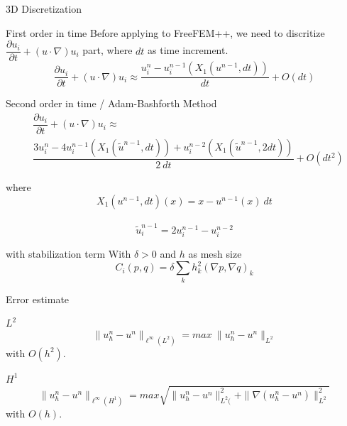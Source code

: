 \documentclass{beamer}
\begin{document}
\begin{frame}{3D Discretization}
\begin{block}{First order in time}
	Before applying to FreeFEM++, we need to discritize $ \dfrac{\partial u_{i}}{\partial t} + (u \cdot \nabla)u_{i} $ part, where $ dt $ as time increment.
	\[ \dfrac{\partial u_{i}}{\partial t} + (u \cdot \nabla)u_{i} \approx \dfrac{u_{i}^{n}-u_{i}^{n-1}(X_{1}(u^{n-1},dt))}{dt} + O(dt) \]
\end{block}
\begin{block}{Second order in time / Adam-Bashforth Method}
	\begin{eqnarray}\nonumber
		&\dfrac{\partial u_{i}}{\partial t} + (u \cdot \nabla)u_{i} \approx\\ \nonumber &\dfrac{3u_{i}^{n}-4u_{i}^{n-1}(X_{1}(\tilde{u}^{n-1},dt))+u_{i}^{n-2}(X_{1}(\tilde{u}^{n-1},2dt))}{2\ dt} + O(dt^2)
	\end{eqnarray}
\end{block}
\end{frame}

\begin{frame}
\begin{block}{where}
	\[ X_{1}(u^{n-1},dt)(x) = x - u^{n-1}(x)\ dt\]\\
	\[\tilde{u}^{n-1}_{i} = 2u_{i}^{n-1}-u_{i}^{n-2}\]
\end{block}
\begin{block}{with stabilization term}
	With $ \delta>0 $ and $ h $ as mesh size
	\[ C_{i}(p,q) = \delta \sum_{k} h_{k}^{2}(\nabla p, \nabla q)_{k} \]
\end{block}
\end{frame}

\begin{frame}{Error estimate}
\begin{block}{$ L^{2} $}
	\[\| u_{h}^{n}-u^{n} \|_{\ell^\infty(L^2)} =  max \ \| u_{h}^{n}-u^{n} \|_{L^{2}}\]
	with $ O(h^2) $.
\end{block}
\begin{block}{$ H^{1} $}
	\[\| u_{h}^{n}-u^{n} \|_{\ell^\infty(H^{1})} = max \sqrt{\| u_{h}^{n}-u^{n} \|_{L^2(}^{2} + \| \nabla (u_{h}^{n}-u^{n}) \|_{L^2}^{2}}\]
	with $ O(h) $.
\end{block}
\end{frame}
\end{document}
